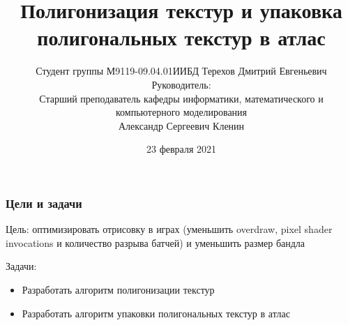 \documentclass[10pt, unicode]{beamer}
\title{Полигонизация текстур и упаковка полигональных текстур в атлас}
\author[Терехов Д.Е.]{Студент группы М9119-09.04.01ИИБД Терехов Дмитрий Евгеньевич\\
Руководитель:\\
Старший преподаватель кафедры информатики, математического и компьютерного моделирования\\
Александр Сергеевич Кленин}
\date{23 февраля 2021}
\begin{document}
    \begin{frame}[fragile]
        \titlepage
        \thispagestyle{empty}
    \end{frame}
    \begin{frame}
        \frametitle{Цели и задачи}
        Цель: оптимизировать отрисовку в играх (уменьшить overdraw, pixel shader invocations и количество разрыва батчей) и уменьшить размер бандла

        Задачи:
        \begin{itemize}
            \item Разработать алгоритм полигонизации текстур
            \item Разработать алгоритм упаковки полигональных текстур в атлас
        \end{itemize}
    \end{frame}
\end{document}
